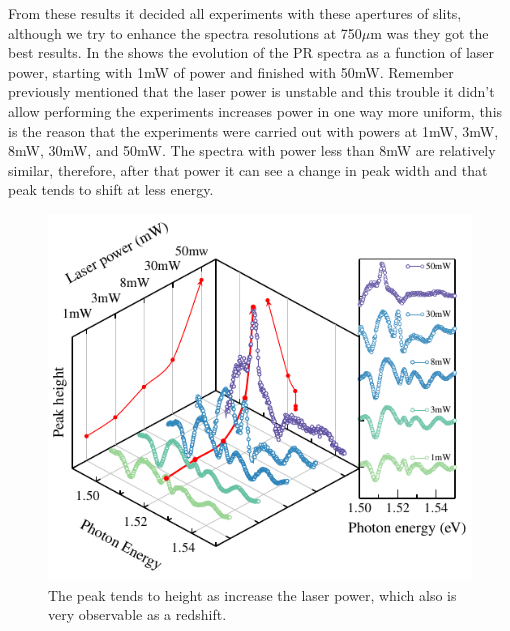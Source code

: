 From these results it decided all experiments with these apertures of slits, although we  try to enhance the spectra resolutions at 750$\mu$m was they got the best results. In the   shows the evolution of the PR spectra as a function of laser power, starting with 1mW of power and finished with 50mW. Remember previously mentioned that the laser power is unstable and this trouble it didn't allow performing  the experiments increases power in one way more uniform, this is the reason that the experiments were carried out with powers at 1mW, 3mW, 8mW, 30mW, and 50mW.  The spectra with power less than 8mW are relatively similar, therefore,  after that power it can see a change in peak width and that peak tends to shift at less energy. \\
\begin{figure}[ht!]
	\centering
	\includegraphics[width=\textwidth]{../figures/chapter-3/pr-plots/build/pr-set6.pdf}
	\caption{The peak tends to height as increase the laser power, which also is very observable as a redshift. }
	\label{fig:chapter-3-pr-plot-set6}
\end{figure}

